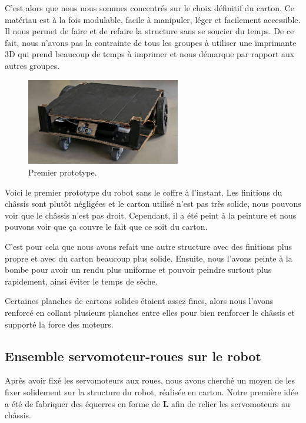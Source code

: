 \documentclass[a4paper,12pt]{report}  %
\begin{document}
C’est alors que nous nous sommes concentrés sur le choix définitif du carton. Ce matériau est à la fois modulable, facile à manipuler, léger et facilement accessible. Il nous permet de faire et de refaire la structure sans se soucier du temps. De ce fait, nous n’avons pas la contrainte de tous les groupes à utiliser une imprimante 3D qui prend beaucoup de temps à imprimer et nous démarque par rapport aux autres groupes.

\begin{figure}[H]
	\centering
	\includegraphics[width=0.6\textwidth]{./attachments/prototype_1.jpg}
	\caption{Premier prototype.}
\end{figure}


Voici le premier prototype du robot sans le coffre à l’instant. Les finitions du châssis sont plutôt négligées et le carton utilisé n’est pas très solide, nous pouvons voir que le châssis n’est pas droit. Cependant, il a été peint à la peinture et nous pouvons voir que ça couvre le fait que ce soit du carton. 

C’est pour cela que nous avons refait une autre structure avec des finitions plus propre et avec du carton beaucoup plus solide. Ensuite, nous l’avons peinte à la bombe pour avoir un rendu plus uniforme et pouvoir peindre surtout plus rapidement, ainsi éviter le temps de sèche. 

Certaines planches de cartons solides étaient assez fines, alors nous l’avons renforcé en collant plusieurs planches entre elles pour bien renforcer le châssis et supporté la force des moteurs.

\subsection{Ensemble servomoteur-roues sur le robot}
Après avoir fixé les servomoteurs aux roues, nous avons cherché un moyen de les fixer solidement sur la structure du robot, réalisée en carton. Notre première idée a été de fabriquer des équerres en forme de \textbf{L} afin de relier les servomoteurs au châssis.
\end{document}
